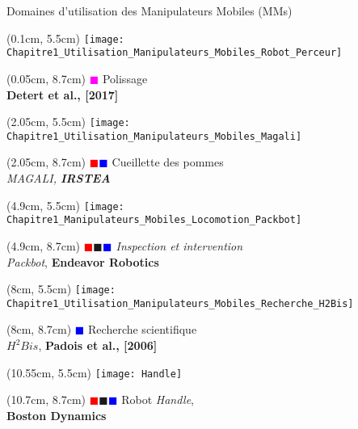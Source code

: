 \documentclass[french]{beamer}
\begin{document}
\begin{frame}{Domaines d'utilisation des Manipulateurs Mobiles (MMs)}
\begin{textblock*}{1.85cm}(0.1cm, 5.5cm)
\centering
\texttt{[image: Chapitre1\_Utilisation\_Manipulateurs\_Mobiles\_Robot\_Perceur]}
\end{textblock*}
\begin{textblock*}{2cm}(0.05cm, 8.7cm)
\centering
\tiny{\textcolor{magenta}{$\blacksquare$} Polissage}\\
\tiny{\textbf{Detert et al., [2017]}}
\end{textblock*}


\begin{textblock*}{2.75cm}(2.05cm, 5.5cm)
\centering
\texttt{[image: Chapitre1\_Utilisation\_Manipulateurs\_Mobiles\_Magali]}
\end{textblock*}
\begin{textblock*}{2.75cm}(2.05cm, 8.7cm)
\centering
\tiny{\textcolor{red}{$\blacksquare$}\textcolor{blue}{$\blacksquare$} Cueillette des pommes}\\ 
\tiny{\textit{MAGALI, \textbf{IRSTEA}}}
\end{textblock*}

\begin{textblock*}{3cm}(4.9cm, 5.5cm)
\centering
\texttt{[image: Chapitre1\_Manipulateurs\_Mobiles\_Locomotion\_Packbot]}
\end{textblock*}
\begin{textblock*}{3cm}(4.9cm, 8.7cm)
\centering
\tiny{\textit{\textcolor{red}{$\blacksquare$}\textcolor{vert}{$\blacksquare$}\textcolor{blue}{$\blacksquare$} Inspection et intervention}\\
\tiny{\textit{Packbot}}, \textbf{Endeavor Robotics}}\\
\end{textblock*}

\begin{textblock*}{2.5cm}(8cm, 5.5cm)
\centering
\texttt{[image: Chapitre1\_Utilisation\_Manipulateurs\_Mobiles\_Recherche\_H2Bis]}
\end{textblock*}
\begin{textblock*}{2.75cm}(8cm, 8.7cm)
\centering
\tiny{\textcolor{blue}{$\blacksquare$} Recherche scientifique}\\
\tiny{\textit{$H^2Bis$}, \textbf{Padois et al., [2006]}}\\
\end{textblock*}

\begin{textblock*}{2.2cm}(10.55cm, 5.5cm)
\centering
\texttt{[image: Handle]}
\end{textblock*}
\begin{textblock*}{2cm}(10.7cm, 8.7cm)
\centering
\tiny{\textcolor{red}{$\blacksquare$}\textcolor{vert}{$\blacksquare$}\textcolor{blue}{$\blacksquare$} Robot \textit{Handle},\\ \textbf{Boston Dynamics}}
\end{textblock*}


\end{frame}
\end{document}
